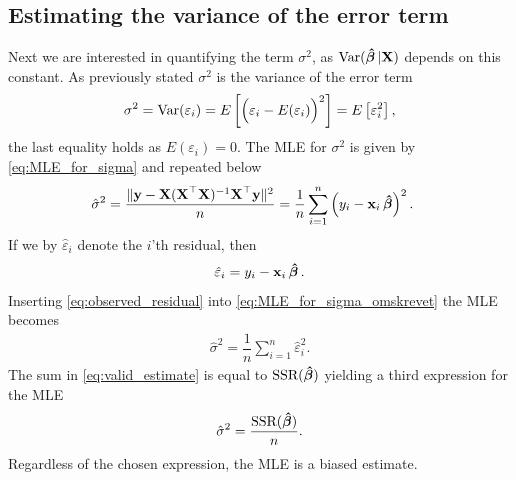 \subsection{Estimating the variance of the error term}
Next we are interested in quantifying the term $\sigma^2$, as $\operatorname{\text{Var}}(\operatorname{\boldsymbol{\hat{\beta}}}|\mathbf{X})$ depends on this constant.
As previously stated $\sigma^2$ is the variance of the error term
\begin{align*}
    \sigma^2 = \operatorname{\text{Var}}(\varepsilon_i) =  E\left[\Big(\varepsilon_i - E(\varepsilon_i)\Big)^2\right] = E\left[\varepsilon_i^2\right],
\end{align*}
the last equality holds as $E(\varepsilon_i) = 0$.
The MLE for $\sigma^2$ is given by \eqref{eq:MLE_for_sigma} and repeated below
\begin{align}\label{eq:MLE_for_sigma_omskrevet}
    \hat{\sigma}^2 &= \frac{\|\textbf{y} - \textbf{X}( \textbf{X}^\top\textbf{X} )^{-1}\textbf{X}^\top\textbf{y}\|^2}{n}
    = \dfrac{1}{n}\sum_{i=1}^n \left(y_i - \mathbf{x}_i\operatorname{\boldsymbol{\hat{\beta}}}\right)^2.
\end{align}
If we by $\hat{\varepsilon}_i$ denote the $i$'th residual, then
\begin{align}\label{eq:observed_residual}
    \hat{\varepsilon}_i = y_i - \mathbf{x}_i\operatorname{\boldsymbol{\hat{\beta}}}.
\end{align}
Inserting \eqref{eq:observed_residual} into \eqref{eq:MLE_for_sigma_omskrevet} the MLE becomes
\begin{align}\label{eq:valid_estimate}
    \hat{\sigma}^2 = \dfrac{1}{n}\sum_{i=1}^n \hat{\varepsilon}_i^2.
\end{align}
The sum in \eqref{eq:valid_estimate} is equal to $\operatorname{\text{SSR}}(\operatorname{\boldsymbol{\hat{\beta}}})$ yielding a third expression for the MLE
\begin{align}
    \hat{\sigma}^2 = \frac{\operatorname{\text{SSR}}(\operatorname{\boldsymbol{\hat{\beta}}})}{n}.
\end{align}
Regardless of the chosen expression, the MLE is a biased estimate.
